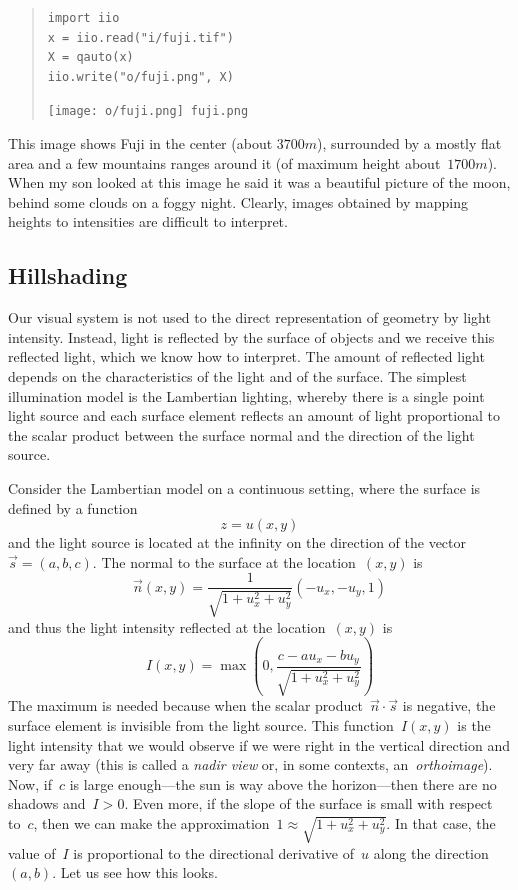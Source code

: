\begin{quote}
\begin{verbatim}
import iio
x = iio.read("i/fuji.tif")
X = qauto(x)
iio.write("o/fuji.png", X)
\end{verbatim}
\texttt{[image: o/fuji.png]}~\verb+fuji.png+
\end{quote}

This image shows Fuji in the center (about $3700m$), surrounded by a mostly
flat area and a few mountains ranges around it (of maximum height
about~$1700m$).  When my son looked at this image he said it was a beautiful
picture of the moon, behind some clouds on a foggy night.  Clearly, images
obtained by mapping heights to intensities are difficult to interpret.


\subsection{Hillshading}

Our visual system is not used to the direct representation of geometry by
light intensity.
Instead, light is reflected by the surface of objects and we
receive this reflected light, which we know how to interpret.  The amount of
reflected light depends on the characteristics of the light and of the
surface.  The simplest
illumination model is the Lambertian lighting, whereby there is a single
point light source and each surface element reflects an amount of light
proportional to the scalar product between the surface normal and the
direction of the light source.

Consider the Lambertian model on a continuous setting, where the surface is
defined by a function~\[z=u(x,y)\] and the light source is located at the
infinity on the direction of the vector~$\vec s = (a,b,c)$.  The normal to
the surface at the location~$(x,y)$ is
\[
	\vec n(x,y) = \frac{1}{\sqrt{1+u_x^2+u_y^2}}\left(-u_x, -u_y, 1\right)
\]
and thus the light intensity reflected at the location~$(x,y)$ is
\[
	I(x,y) = \max\left(0, 
		\frac{c - au_x - bu_y}{\sqrt{1+u_x^2+u_y^2}}
	\right)
\]
The maximum is needed because when the scalar product~$\vec n\cdot\vec s$ is
negative, the surface element is invisible from the light source.  This
function~$I(x,y)$ is the light intensity that we would observe if we were
right in the vertical direction and very far away (this is called a
\emph{nadir view} or, in some contexts, an~\emph{orthoimage}).  Now, if~$c$
is large enough---the sun is way above the horizon---then there are no
shadows and~$I>0$.  Even more, if the slope of the surface is small with
respect to~$c$, then we can make the
approximation~$1\approx\sqrt{1+u_x^2+u_y^2}$.  In that case, the value of~$I$
is proportional to the directional derivative of~$u$ along the
direction~$(a,b)$.  Let us see how this looks.

